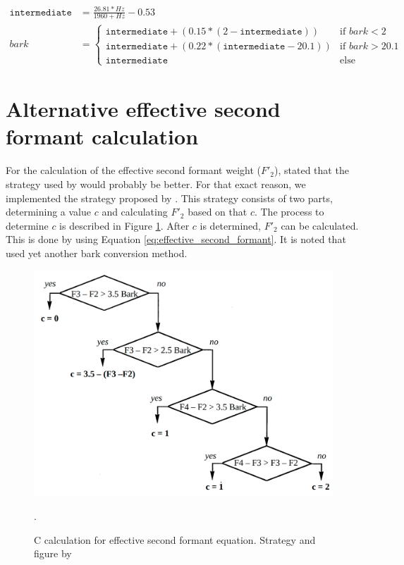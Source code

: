 \begin{equation}
\begin{aligned}
  \texttt{intermediate} &= \frac{26.81 * Hz}{1960 + Hz} - 0.53 \\
  bark &= 
    \begin{cases}
      \texttt{intermediate}+(0.15 * (2-\texttt{intermediate})) & \text{if } bark < 2 \\
      \texttt{intermediate}+(0.22 * (\texttt{intermediate} - 20.1)) & \text{if } bark > 20.1 \\
      \texttt{intermediate} & \text{else}
    \end{cases} 
\end{aligned}
\label{eq:bark_conversion_matlab}      
\end{equation}


\section{Alternative effective second formant calculation}
\label{sec:alternative_second_formant}

For the calculation of the effective second formant weight ($F'_2$), \citet{deBoer2000} stated that the strategy used by \citet{Schwartz1997} would probably be better.
For that exact reason, we implemented the strategy proposed by \citet{Schwartz1997}.
This strategy consists of two parts, determining a value $c$ and calculating $F'_2$ based on that $c$.
The process to determine $c$ is described in Figure \ref{fig:effective_second_formant}.
After $c$ is determined, $F'_2$ can be calculated.
This is done by using Equation \ref{eq:effective_second_formant}.
It is noted that \citet{Schwartz1997} used yet another bark conversion method.

\begin{figure}[H]
    \centering
    \includegraphics[width=0.5\linewidth]{images/improving/effective_second_formant.png}
    \captionsetup{width=\linewidth}
    \captionsetup{justification=centering}
    \caption{C calculation for effective second formant equation. Strategy and figure by \citet{Schwartz1997}}.
    \label{fig:effective_second_formant}
\end{figure}

